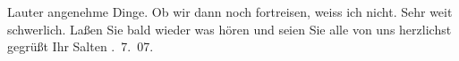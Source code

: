                Lauter angenehme Dinge. Ob wir dann noch fortreisen, weiss ich nicht. Sehr weit
               schwerlich. Laßen Sie bald wieder was hören und seien Sie alle von uns herzlichst
               gegrüßt\pend
           \pstart Ihr \spacefill\mbox{Salten}\pend{}
. 7. 07.\pend
           \endnumbering{}  \newcommand{\dateiname}{L03488}\newcommand{\titel}{Felix Salten an Arthur Schnitzler, 15. 7. 1907}\newcommand{\editorInnen}{Martin Anton Müller und Laura Untner}
